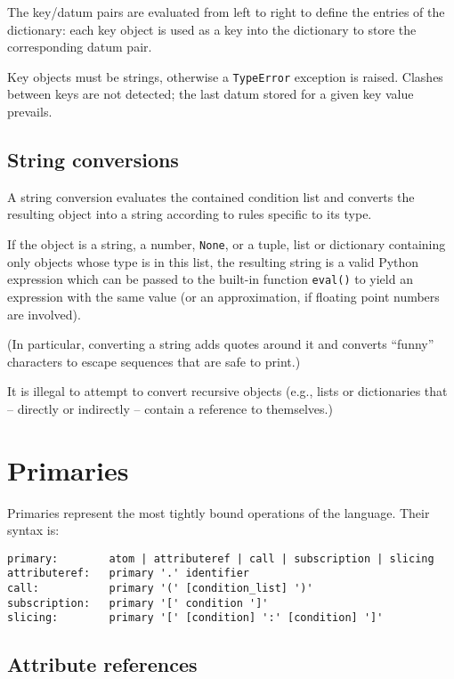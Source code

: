 The key/datum pairs are evaluated from left to right to
define the entries of the dictionary:
each key object is used as a key into the dictionary to store
the corresponding datum pair.

Key objects must be strings, otherwise a {\tt TypeError}
exception is raised.
Clashes between keys are not detected; the last datum stored for a given
key value prevails.

\subsection{String conversions}

A string conversion evaluates the contained condition list and converts the
resulting object into a string according to rules specific to its type.

If the object is a string, a number, \verb/None/, or a tuple, list or
dictionary containing only objects whose type is in this list,
the resulting
string is a valid Python expression which can be passed to the
built-in function \verb/eval()/ to yield an expression with the
same value (or an approximation, if floating point numbers are
involved).

(In particular, converting a string adds quotes around it and converts
``funny'' characters to escape sequences that are safe to print.)

It is illegal to attempt to convert recursive objects (e.g.,
lists or dictionaries that -- directly or indirectly -- contain a reference
to themselves.)

\section{Primaries}

Primaries represent the most tightly bound operations of the language.
Their syntax is:

\begin{verbatim}
primary:        atom | attributeref | call | subscription | slicing
attributeref:   primary '.' identifier
call:           primary '(' [condition_list] ')'
subscription:   primary '[' condition ']'
slicing:        primary '[' [condition] ':' [condition] ']'
\end{verbatim}

\subsection{Attribute references}


